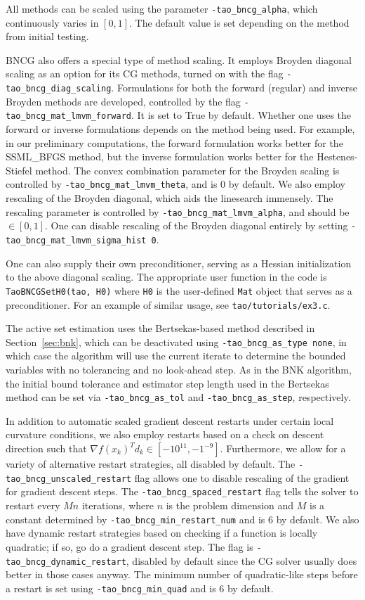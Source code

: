 All methods can be scaled using the parameter {\tt -tao\_bncg\_alpha}, which continuously
 varies in $[0, 1]$. The default value is set depending on the method from initial testing.

BNCG also offers a special type of method scaling. It employs Broyden diagonal scaling
as an option for its CG methods, turned on with the flag {\tt -tao\_bncg\_diag\_scaling}. Formulations for both the forward (regular) and inverse Broyden methods are developed,
 controlled by the flag {\tt -tao\_bncg\_mat\_lmvm\_forward}. It is set to True 
by default. Whether one uses the forward
or inverse formulations depends on the method being used. For example, in our preliminary computations,
the forward formulation works better for the SSML\_BFGS method, but the inverse formulation
works better for the Hestenes-Stiefel method. The convex combination parameter for the
 Broyden scaling is controlled by {\tt -tao\_bncg\_mat\_lmvm\_theta}, and is 0 by default. We also
employ rescaling of the Broyden diagonal, which aids the linesearch immensely. 
The rescaling parameter is controlled by {\tt -tao\_bncg\_mat\_lmvm\_alpha}, 
and should be $\in [0, 1]$. One can disable rescaling of the Broyden diagonal entirely by
 setting {\tt -tao\_bncg\_mat\_lmvm\_sigma\_hist 0}.

One can also supply their own preconditioner, serving as a Hessian initialization to
 the above diagonal scaling.
The appropriate user function in the code is {\tt TaoBNCGSetH0(tao, H0)} where 
{\tt H0} is the user-defined {\tt Mat} object that serves as a preconditioner. 
For an example of similar usage, see {\tt tao/tutorials/ex3.c}.

The active set estimation uses the Bertsekas-based method described in Section~\ref{sec:bnk},
which can be deactivated using {\tt -tao\_bncg\_as\_type none}, in which case the 
algorithm will use the current iterate to determine the bounded variables with no tolerancing 
and no look-ahead step. As in the BNK algorithm, the initial bound tolerance and estimator
step length used in the Bertsekas method can be set via {\tt -tao\_bncg\_as\_tol} and 
{\tt -tao\_bncg\_as\_step}, respectively.

In addition to automatic scaled gradient descent restarts under certain local curvature conditions,
we also employ restarts based on a check on descent direction 
such that $\nabla f(x_k)^T d_k \in [-10^{11}, -1^{-9}]$.
Furthermore, we allow for a variety of alternative restart strategies, 
all disabled by default.
The {\tt -tao\_bncg\_unscaled\_restart} flag allows one to 
disable rescaling of the gradient for
gradient descent steps. The {\tt -tao\_bncg\_spaced\_restart} flag tells the 
solver to restart every $Mn$ iterations,
where $n$ is the problem dimension and $M$ is a constant 
determined by {\tt -tao\_bncg\_min\_restart\_num} and is
6 by default. We also have dynamic restart strategies based on 
checking if a function is locally quadratic; if so,
go do a gradient descent step. The flag is {\tt -tao\_bncg\_dynamic\_restart}, 
disabled by default since the CG
solver usually does better in those cases anyway. 
The minimum number of quadratic-like steps before a restart is 
set using {\tt -tao\_bncg\_min\_quad} and is 6 by default. 


